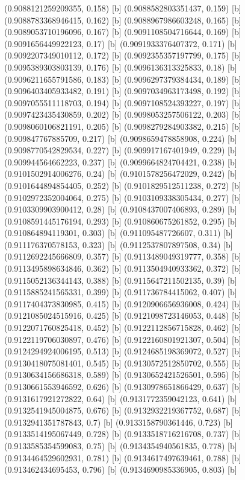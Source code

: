 {{{(0.9088121259209355, 0.158) [b] 
(0.9088582803351437, 0.159) [b] 
(0.9088783368946415, 0.162) [b] 
(0.9088967986603248, 0.165) [b] 
(0.9089053710196096, 0.167) [b] 
(0.9091108504716644, 0.169) [b] 
(0.9091656449922123, 0.17) [b] 
(0.9091933376407372, 0.171) [b] 
(0.9092207349010112, 0.172) [b] 
(0.9092355357197799, 0.175) [b] 
(0.9095389303803139, 0.176) [b] 
(0.9096136313325833, 0.18) [b] 
(0.9096211655791586, 0.183) [b] 
(0.9096297379384434, 0.189) [b] 
(0.9096403405933482, 0.191) [b] 
(0.9097034963173498, 0.192) [b] 
(0.9097055511118703, 0.194) [b] 
(0.9097108524393227, 0.197) [b] 
(0.9097423435430859, 0.202) [b] 
(0.9098053257506122, 0.203) [b] 
(0.9098060106821191, 0.205) [b] 
(0.9098279284903382, 0.215) [b] 
(0.909847767885709, 0.217) [b] 
(0.9098659478858908, 0.224) [b] 
(0.9098770542829534, 0.227) [b] 
(0.909917167401949, 0.229) [b] 
(0.909944564662223, 0.237) [b] 
(0.9099664824704421, 0.238) [b] 
(0.9101502914006276, 0.24) [b] 
(0.9101578256472029, 0.242) [b] 
(0.9101644894854405, 0.252) [b] 
(0.9101829512511238, 0.272) [b] 
(0.9102972352004064, 0.275) [b] 
(0.9103109338305434, 0.277) [b] 
(0.9103309903900412, 0.28) [b] 
(0.9108437007406893, 0.289) [b] 
(0.9108591445176194, 0.293) [b] 
(0.910860675261852, 0.295) [b] 
(0.910864894119301, 0.303) [b] 
(0.911095487726607, 0.311) [b] 
(0.911176370578153, 0.323) [b] 
(0.9112537807897508, 0.34) [b] 
(0.9112692245666809, 0.357) [b] 
(0.9113489049319777, 0.358) [b] 
(0.9113495898634846, 0.362) [b] 
(0.9113504940933362, 0.372) [b] 
(0.9115052136344143, 0.388) [b] 
(0.9115647211502135, 0.39) [b] 
(0.9115885241565331, 0.399) [b] 
(0.911736784415062, 0.407) [b] 
(0.9117404373830985, 0.415) [b] 
(0.9120906656936008, 0.424) [b] 
(0.9121085024515916, 0.425) [b] 
(0.9121098723146053, 0.448) [b] 
(0.9122071760825418, 0.452) [b] 
(0.9122112856715828, 0.462) [b] 
(0.9122119706030897, 0.476) [b] 
(0.9122160801921307, 0.504) [b] 
(0.9124294924006195, 0.513) [b] 
(0.9124685198369072, 0.527) [b] 
(0.9130418075081401, 0.545) [b] 
(0.9130572512850702, 0.555) [b] 
(0.9130634156686318, 0.589) [b] 
(0.9130652421526501, 0.595) [b] 
(0.9130661553946592, 0.626) [b] 
(0.9130978651866429, 0.637) [b] 
(0.9131617921272822, 0.64) [b] 
(0.9131772359042123, 0.641) [b] 
(0.9132541945004875, 0.676) [b] 
(0.9132932219367752, 0.687) [b] 
(0.9132941351787843, 0.7) [b] 
(0.9133158790361446, 0.723) [b] 
(0.9133514195067449, 0.728) [b] 
(0.9133518716216708, 0.737) [b] 
(0.9133585354599083, 0.75) [b] 
(0.9134354940561835, 0.778) [b] 
(0.9134464529602931, 0.781) [b] 
(0.9134617497639461, 0.788) [b] 
(0.913462434695453, 0.796) [b] 
(0.9134690985336905, 0.803) [b] 
}}}
